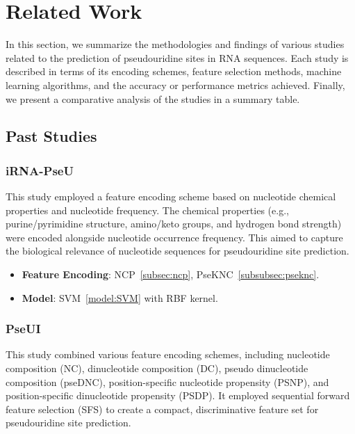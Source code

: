 \chapter{Related Work}\label{ch:related-work}
  In this section, we summarize the methodologies and findings of various studies related to the prediction of pseudouridine sites in RNA sequences.
  Each study is described in terms of its encoding schemes, feature selection methods, machine learning algorithms, and the accuracy or performance metrics achieved.
  Finally, we present a comparative analysis of the studies in a summary table.


  \section{Past Studies}\label{sec:past-studies}

    \subsection*{iRNA-PseU \cite{chen_irna-pseu_nodate}}\label{subsec:iRNA-PseU}
      This study employed a feature encoding scheme based on nucleotide chemical properties and nucleotide frequency.
      The chemical properties (e.g., purine/pyrimidine structure, amino/keto groups, and hydrogen bond strength) were encoded alongside nucleotide occurrence frequency.
      This aimed to capture the biological relevance of nucleotide sequences for pseudouridine site prediction.

      \begin{itemize}
        \item \textbf{Feature Encoding}: NCP~\ref{subsec:ncp}, PseKNC~\ref{subsubsec:pseknc}.
        \item \textbf{Model}: SVM~\ref{model:SVM} with RBF kernel.
      \end{itemize}

    \subsection*{PseUI \cite{he_pseui_2018}}\label{subsec:PseUI}
      This study combined various feature encoding schemes, including nucleotide composition (NC), dinucleotide composition (DC), pseudo dinucleotide composition (pseDNC), position-specific nucleotide propensity (PSNP), and position-specific dinucleotide propensity (PSDP). It employed sequential forward feature selection (SFS) to create a compact, discriminative feature set for pseudouridine site prediction.

